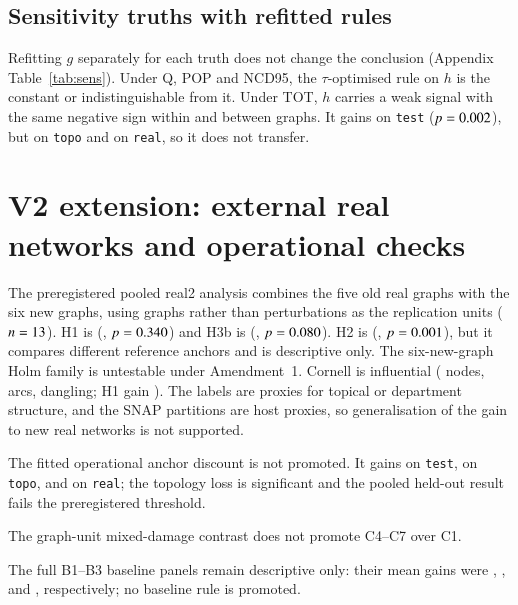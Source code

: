 \documentclass[11pt,a4paper]{article}
\theoremstyle{definition}
\theoremstyle{remark}
\begin{document}


\subsection{Sensitivity truths with refitted rules}
Refitting $g$ separately for each truth does not change the conclusion (Appendix
Table~\ref{tab:sens}). Under Q, POP and NCD95, the $\tau$-optimised rule on $h$ is the constant or
indistinguishable from it. Under TOT, $h$ carries a weak signal with the same negative sign within and
between graphs. It gains \TotHTest{} on \texttt{test} ($p=0.002$), but \TotHTopo{} on \texttt{topo}
and \TotHReal{} on \texttt{real}, so it does not transfer.

\FloatBarrier
\section{V2 extension: external real networks and operational checks}
\label{sec:v2extension}

The preregistered pooled real2 analysis combines the five old real graphs with the six
new graphs, using graphs rather than perturbations as the replication units
($n=13$). H1 is \VTwoRealHone{} (\VTwoRealHoneWins{}, $p=0.340$)
and H3b is \VTwoRealHthree{} (\VTwoRealHthreeWins{}, $p=0.080$).
H2 is \VTwoRealHtwo{} (\VTwoRealHtwoWins{}, $p=0.001$), but it compares
different reference anchors and is descriptive only. The six-new-graph Holm family
is untestable under Amendment~1. Cornell is influential (\VTwoCornellN{} nodes,
\VTwoCornellM{} arcs, \VTwoCornellDang{} dangling; H1 gain \VTwoCornellHone{}).
The labels are proxies for topical or department
structure, and the SNAP partitions are host proxies, so generalisation of the gain
to new real networks is not supported.



The fitted operational anchor discount is not promoted. It gains
\VTwoAnchorTest{} on \texttt{test}, \VTwoAnchorTopo{} on \texttt{topo}, and
\VTwoAnchorReal{} on \texttt{real}; the topology loss is significant and the pooled
held-out result fails the preregistered threshold.


The graph-unit mixed-damage contrast does not promote C4--C7 over C1.

The full B1--B3 baseline panels remain descriptive only: their mean gains were
\VTwoBOneMean{}, \VTwoBTwoMean{}, and \VTwoBThreeMean{}, respectively; no
baseline rule is promoted.
\end{document}
